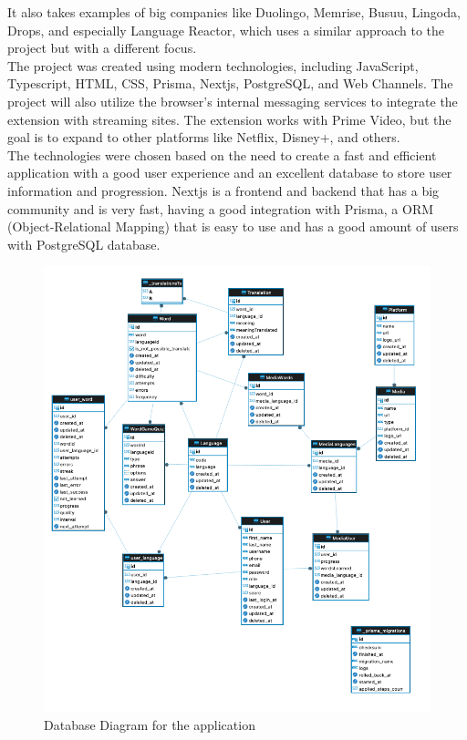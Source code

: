 \documentclass[12pt]{article}
\begin{document}
It also takes examples of big companies like Duolingo, Memrise, Busuu, Lingoda, Drops, and especially Language Reactor, which uses a similar approach to the project but with a different focus.  \\
The project was created using modern technologies, including JavaScript, Typescript, HTML, CSS, Prisma, Nextjs, PostgreSQL, and Web Channels. The project will also utilize the browser's internal messaging services to integrate the extension with streaming sites. The extension works with Prime Video, but the goal is to expand to other platforms like Netflix, Disney+, and others. \\
The technologies were chosen based on the need to create a fast and efficient application with a good user experience and an excellent database to store user information and progression. Nextjs is a frontend and backend that has a big community and is very fast, having a good integration with Prisma, a ORM (Object-Relational Mapping) that is easy to use and has a good amount of users with PostgreSQL database.  \\
\begin{figure}[h]
  \centering
  \caption{
  Database Diagram for the application
  }
  \label{fig:database_diagram}
  \includegraphics[width=1\textwidth]{assets/23.png}
\end{figure}
\end{document}
